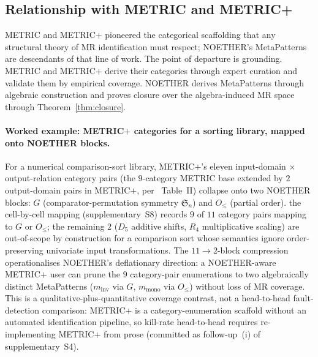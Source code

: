 \documentclass[manuscript]{acmart}
\begin{document}
\subsection{Relationship with METRIC and METRIC+}
\label{subsec:metricplus-relationship}

METRIC and METRIC+ pioneered the categorical scaffolding that any structural theory of MR identification must respect; NOETHER's MetaPatterns are descendants of that line of work. The point of departure is grounding. METRIC and METRIC+ derive their categories through expert curation and validate them by empirical coverage. NOETHER derives MetaPatterns through algebraic construction and proves closure over the algebra-induced MR space through Theorem~\ref{thm:closure}.

\paragraph{Worked example: METRIC$+$ categories for a sorting library, mapped onto NOETHER blocks.}
\label{para:metricplus-sorting}
For a numerical comparison-sort library, METRIC$+$'s eleven input-domain $\times$ output-relation category pairs (the $9$-category METRIC base extended by $2$ output-domain pairs in METRIC$+$, per~\cite{SunMETRICplus2021} Table~II) collapse onto two NOETHER blocks: $G$ (comparator-permutation symmetry $\mathfrak{S}_n$) and $O_{\le}$ (partial order). the cell-by-cell mapping (supplementary~S8) records $9$ of $11$ category pairs mapping to $G$ or $O_{\le}$; the remaining $2$ ($D_5$ additive shifts, $R_4$ multiplicative scaling) are out-of-scope by construction for a comparison sort whose semantics ignore order-preserving univariate input transformations. The $11 \to 2$-block compression operationalises NOETHER's deflationary direction: a NOETHER-aware METRIC$+$ user can prune the $9$ category-pair enumerations to two algebraically distinct MetaPatterns ($m_{\mathrm{inv}}$ via $G$, $m_{\mathrm{mono}}$ via $O_{\le}$) without loss of MR coverage. This is a qualitative-plus-quantitative coverage contrast, not a head-to-head fault-detection comparison: METRIC$+$ is a category-enumeration scaffold without an automated identification pipeline, so kill-rate head-to-head requires re-implementing METRIC$+$ from prose (committed as follow-up~(i) of supplementary~S4).
\end{document}
